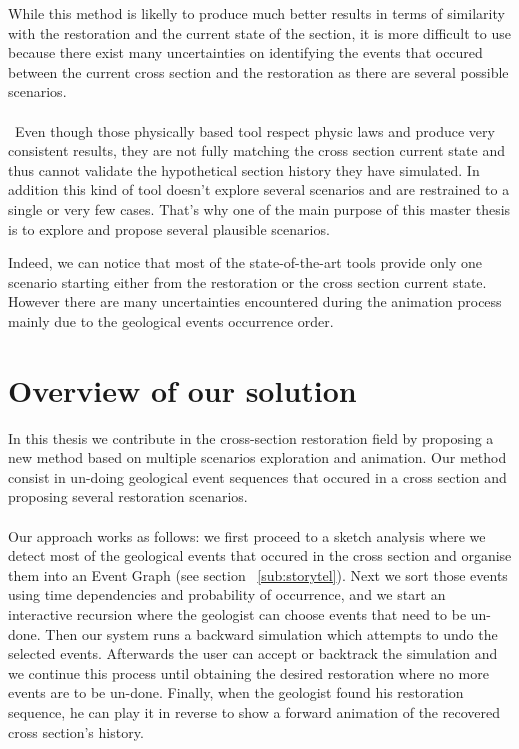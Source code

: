 \documentclass[12pt, a4paper]{report} %
\begin{document}
 While this method is likelly to produce much better results in terms of similarity with the restoration and the current state of the section, it is more difficult to use because there exist many uncertainties on identifying the events that occured between the current cross section and the restoration as there are several possible scenarios. \\\\\
Even though those physically based tool respect physic laws and produce very consistent results, they are not fully matching the cross section current state and thus cannot validate the hypothetical section history they have simulated. In addition this kind of tool doesn't explore several scenarios and are restrained to a single or very few cases. 
That's why one of the main purpose of this master thesis is to explore and propose several plausible scenarios.

%
Indeed, we can notice that most of the state-of-the-art tools provide only one scenario starting either from the restoration or the cross section current state. However there are many uncertainties encountered during the animation process mainly due to the geological events occurrence order.
%
\chapter{Overview of our solution}

In this thesis we contribute in the cross-section restoration field by proposing a new method based on multiple scenarios exploration and animation. Our method consist in un-doing geological event sequences that occured in a cross section and proposing several restoration scenarios.\\\\

Our approach works as follows: we first proceed to a sketch analysis where we detect most of the geological events that occured in the cross section and organise them into an Event Graph (see section ~\ref{sub:storytel}).
Next we sort those events using time dependencies and probability of occurrence, and we start an interactive recursion where the geologist can choose events that need to be un-done. Then our system runs a backward simulation which attempts to undo the selected events. Afterwards the user can accept or backtrack the simulation and we continue this process until obtaining the desired restoration where no more events are to be un-done.
Finally, when the geologist found his restoration sequence, he can play it in reverse to show a forward animation of the recovered cross section's history.
\end{document}
